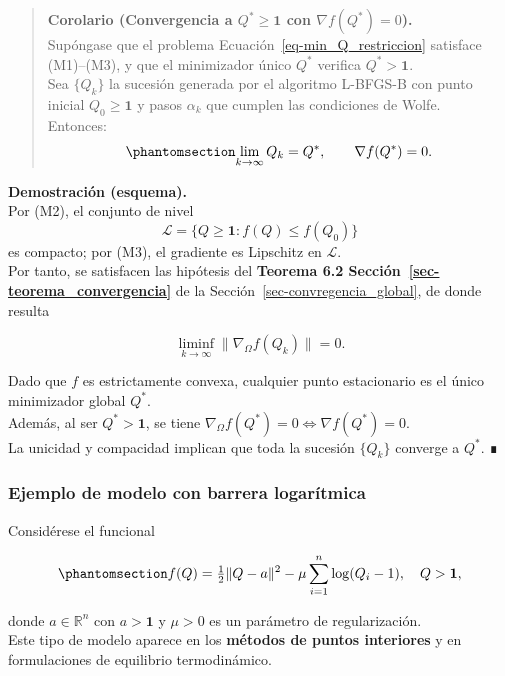 \documentclass[
  spanish,
  us-letterpaper,
]{scrreprt}
\numberwithin{equation}{section}
\begin{document}
\begin{quote}
\textbf{Corolario (Convergencia a \(Q^* \ge \mathbf{1}\) con
\(\nabla f(Q^*) = 0\)).}\\
Supóngase que el problema Ecuación~\ref{eq-min_Q_restriccion} satisface
(M1)--(M3), y que el minimizador único \(Q^*\) verifica
\(Q^* > \mathbf{1}\).\\
Sea \(\{Q_k\}\) la sucesión generada por el algoritmo L-BFGS-B con punto
inicial \(Q_0 \ge \mathbf{1}\) y pasos \(\alpha_k\) que cumplen las
condiciones de Wolfe.\\
Entonces: \begin{equation}\phantomsection\label{eq-81}{
\lim_{k \to \infty} Q_k = Q^*, \qquad \nabla f(Q^*) = 0.
}\end{equation}
\end{quote}

\textbf{Demostración (esquema).}\\
Por (M2), el conjunto de nivel\\
\[
\mathcal{L} = \{Q \ge \mathbf{1} : f(Q) \le f(Q_0)\}
\] es compacto; por (M3), el gradiente es Lipschitz en
\(\mathcal{L}\).\\
Por tanto, se satisfacen las hipótesis del \textbf{Teorema 6.2
Sección~\ref{sec-teorema_convergencia}} de la
Sección~\ref{sec-convregencia_global}, de donde resulta

\[
\liminf_{k \to \infty} \|\nabla_\Omega f(Q_k)\| = 0.
\]

Dado que \(f\) es estrictamente convexa, cualquier punto estacionario es
el único minimizador global \(Q^*\).\\
Además, al ser \(Q^* > \mathbf{1}\), se tiene
\(\nabla_\Omega f(Q^*) = 0 \iff \nabla f(Q^*) = 0\).\\
La unicidad y compacidad implican que toda la sucesión \(\{Q_k\}\)
converge a \(Q^*\). ∎

\subsubsection{Ejemplo de modelo con barrera
logarítmica}\label{ejemplo-de-modelo-con-barrera-logaruxedtmica}

Considérese el funcional

\begin{equation}\phantomsection\label{eq-82}{
f(Q) = \tfrac{1}{2}\|Q - a\|^2 - \mu \sum_{i=1}^n \log(Q_i - 1),
\quad Q > \mathbf{1}, 
}\end{equation}

donde \(a \in \mathbb{R}^n\) con \(a > \mathbf{1}\) y \(\mu > 0\) es un
parámetro de regularización.\\
Este tipo de modelo aparece en los \textbf{métodos de puntos interiores}
y en formulaciones de equilibrio termodinámico.
\end{document}
